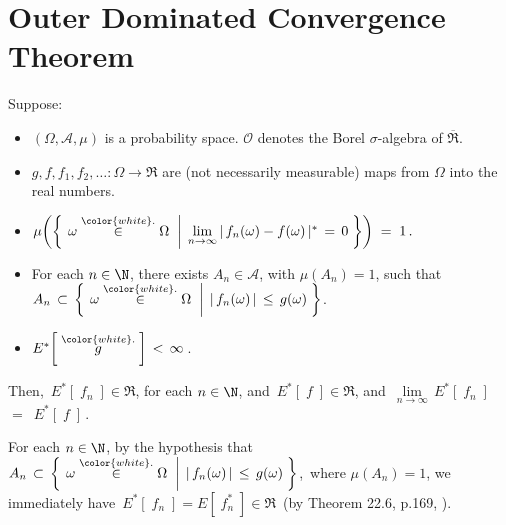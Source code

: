 

\section{Outer Dominated Convergence Theorem}
\setcounter{theorem}{0}
\setcounter{equation}{0}


\renewcommand{\theenumi}{\roman{enumi}}
\renewcommand{\labelenumi}{\textnormal{(\theenumi)}$\;\;$}


\begin{theorem}
\mbox{}\vskip 0.1cm
\noindent
Suppose:
\begin{itemize}
\item
	$(\Omega,\mathcal{A},\mu)$ is a probability space.
	$\mathcal{O}$ denotes the Borel $\sigma$-algebra of $\overline{\Re}$.
\item
	$g, f, f_{1}, f_{2}, \ldots : \Omega \longrightarrow \Re$ are (not necessarily measurable)
	maps from $\Omega$ into the real numbers.
\item
	$\mu\!\left(\left\{\;
		\left.
		\omega \overset{{\color{white}.}}{\in} \Omega
		\;\;\right\vert\;
		\underset{n\rightarrow\infty}{\lim}\,\vert\, f_{n}(\omega) - f(\omega) \,\vert^{*} \,=\, 0
	\;\right\}\right)
	\; = \; 1\,.$
\item
	For each $n \in \N$, there exists $A_{n} \in \mathcal{A}$, with $\mu(A_{n}) = 1$, such that\;
	$A_{n}
	\,\subset\,
		\left\{\;
			\left.
			\omega \overset{{\color{white}.}}{\in} \Omega
			\;\;\right\vert\;
			\vert\,f_{n}(\omega)\,\vert \,\leq\, g(\omega)
		\;\right\}$.
\item
	$E^{*}\!\left[\;\overset{{\color{white}.}}{g}\;\right] \,<\, \infty$\,.
\end{itemize}
Then,
\,$E^{*}\!\left[\;f_{n}\;\right] \in \Re$, for each $n\in\N$, and
\,$E^{*}\!\left[\;f\;\right] \in \Re$, and
\,$\underset{n\rightarrow\infty}{\lim}\,E^{*}\!\left[\;f_{n}\;\right]$ \,$=$\, $E^{*}\!\left[\;f\;\right]$\,.
\end{theorem}
\proof
For each $n\in\N$, by the hypothesis that
\,$A_{n} \,\subset\,
	\left\{\;
		\left.
		\omega \overset{{\color{white}.}}{\in} \Omega
		\;\;\right\vert\;
		\vert\,f_{n}(\omega)\,\vert \,\leq\, g(\omega)
	\;\right\}$,\,
where $\mu(A_{n}) = 1$, we immediately have
\,$E^{*}\!\left[\;f_{n}\;\right] = E\!\left[\;f_{n}^{*}\;\right] \in \Re$\, (by Theorem 22.6, p.169, \cite{Aliprantis1998}).

